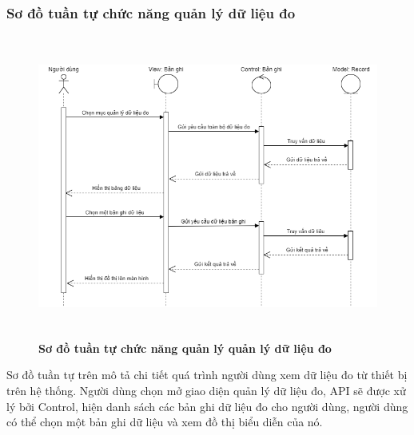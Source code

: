 \subsubsection{Sơ đồ tuần tự chức năng quản lý dữ liệu đo}
\begin{figure}[H]
  \centering
  \includegraphics[width=14cm,height=10cm]{Images/sequence/sequence_manage_record.png}
  \caption[Sơ đồ tuần tự chức năng quản lý quản lý dữ liệu đo]{\bfseries \fontsize{12pt}{0pt}
  \selectfont Sơ đồ tuần tự chức năng quản lý quản lý dữ liệu đo}
  \label{sequence_manage_record} %
\end{figure}
Sơ đồ tuần tự trên mô tả chi tiết quá trình người dùng xem dữ liệu đo từ thiết bị trên hệ thống. Người dùng chọn mở giao diện quản lý dữ liệu đo, 
API sẽ được xử lý bởi Control, hiện danh sách các bản ghi dữ liệu đo cho người dùng, người dùng có thể chọn một bản ghi dữ liệu và xem đồ thị biểu diễn
của nó. 

